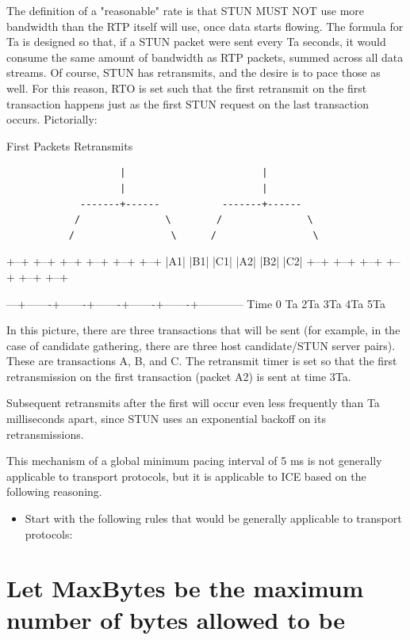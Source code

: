 \documentclass{article}
\begin{document}
The definition of a "reasonable" rate is that STUN MUST NOT use more bandwidth than the RTP itself will use, once data starts flowing. The formula for Ta is designed so that, if a STUN packet were sent every Ta seconds, it would consume the same amount of bandwidth as RTP packets, summed across all data streams.  Of course, STUN has retransmits, and the desire is to pace those as well.  For this reason, RTO is set such that the first retransmit on the first transaction happens just as the first STUN request on the last transaction occurs.  Pictorially:

First Packets              Retransmits

\begin{verbatim}
                    |                        |
                    |                        |
             -------+------           -------+------
            /               \        /               \
           /                 \      /                 \
\end{verbatim}

+--+    +--+    +--+    +--+    +--+    +--+ |A1|    |B1|    |C1|    |A2|    |B2|    |C2| +--+    +--+    +--+    +--+    +--+    +--+

---+-------+-------+-------+-------+-------+------------ Time 0       Ta      2Ta     3Ta     4Ta     5Ta

In this picture, there are three transactions that will be sent (for example, in the case of candidate gathering, there are three host candidate/STUN server pairs).  These are transactions A, B, and C. The retransmit timer is set so that the first retransmission on the first transaction (packet A2) is sent at time 3Ta.

Subsequent retransmits after the first will occur even less frequently than Ta milliseconds apart, since STUN uses an exponential backoff on its retransmissions.

This mechanism of a global minimum pacing interval of 5 ms is not generally applicable to transport protocols, but it is applicable to ICE based on the following reasoning.

\begin{itemize}
\item Start with the following rules that would be generally applicable to transport protocols:
\end{itemize}
\section{Let MaxBytes be the maximum number of bytes allowed to be}
\end{document}
